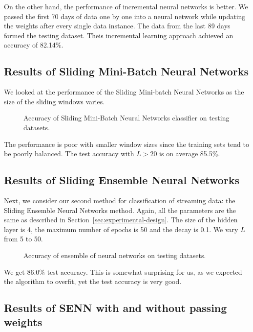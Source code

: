 \documentclass[conference]{IEEEtran}
\begin{document}
		On the other hand, the performance of incremental neural networks is better. We passed the first 70 days of data one by one into a neural network while updating the weights after every single data instance. The data from the last 89 days formed the testing dataset. Theis incremental learning approach achieved an accuracy of 82.14\%.
		
		\subsection{Results of Sliding Mini-Batch Neural Networks}
		
		We looked at the performance of the Sliding Mini-batch Neural Networks as the size of the sliding windows varies.
		\begin{figure}[H]
			\centering
			\caption{Accuracy of Sliding Mini-Batch Neural Networks classifier on testing datasets.}
			\label{fig:accuracy-smnn}
		\end{figure}
		The performance is poor with smaller window sizes since the training sets tend to be poorly balanced. The test accuracy with $L > 20$ is on average 85.5\%.
		
		
		\subsection{Results of Sliding Ensemble Neural Networks}
		\label{sec:results}
		
		Next, we consider our second method for classification of streaming data: the Sliding Ensemble Neural Networks method.
		Again, all the parameters are the same as described in Section~\ref{sec:experimental-design}. The size of the hidden layer is 4, the maximum number of epochs is 50 and the decay is 0.1. We vary $L$ from 5 to 50.
		
		\begin{figure}[H]
			\centering
			\caption{Accuracy of ensemble of neural networks on  testing datasets.}
			\label{fig:results-nnet-ensemble}
		\end{figure}
		
		We get 86.0\% test accuracy. This is somewhat surprising for us, as we expected the algorithm to overfit, yet the test accuracy is very good.
		
		\subsection{Results of SENN with and without passing weights}
		\label{sec:passing-weights}
		
\end{document}
